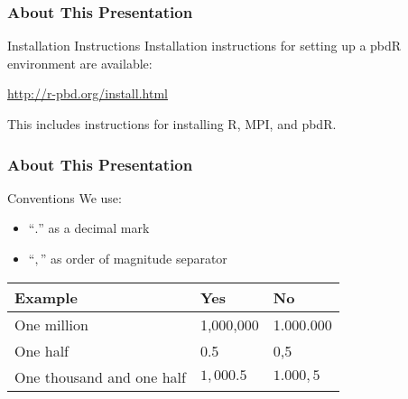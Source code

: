 \begin{frame}
\frametitle{About This Presentation}
 \begin{block}{Installation Instructions}
  Installation instructions for setting up a pbdR environment are available:
  \begin{center}
  \url{http://r-pbd.org/install.html}
  \end{center}
  This includes instructions for installing R, MPI, and pbdR.
 \end{block}
\end{frame}



\begin{frame}%
\frametitle{About This Presentation}
 \begin{block}{Conventions}
    We use:
    \begin{itemize}
    \item ``{\Huge$ .$}'' as a decimal mark
    \item ``{\Huge$,$}'' as order of magnitude separator
    \end{itemize}
    \begin{center}
    \begin{tabular}{|l|l|l|}\hline
      Example & Yes & No \\\hline
      One million & 1,000,000 & 1.000.000\\
      One half & 0.5 & 0,5\\
      One thousand and one half & $1,000.5$ & $1.000,5$\\\hline
    \end{tabular}
    \end{center}
 \end{block}
\end{frame}



